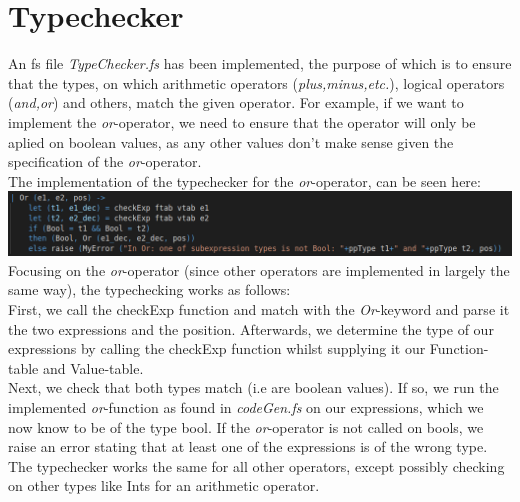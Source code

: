 \section{Typechecker}
An fs file \textit{TypeChecker.fs} has been implemented, the purpose of which is to ensure that the types, on which arithmetic operators (\textit{plus,minus,etc.}), logical operators (\textit{and,or}) and others, match the given operator.
For example, if we want to implement the \textit{or}-operator, we need to ensure that the operator will only be aplied on boolean values, as any other values don't make sense given the specification of the \textit{or}-operator.\\
The implementation of the typechecker for the \textit{or}-operator, can be seen here: \\
\includegraphics[width=\linewidth]{Materials/TypeChecker/Or}\\
Focusing on the \textit{or}-operator (since other operators are implemented in largely the same way), the typechecking works as follows:\\
First, we call the checkExp function and match with the \textit{Or}-keyword and parse it the two expressions and the position.
Afterwards, we determine the type of our expressions by calling the checkExp function whilst supplying it our Function-table and Value-table.\\
Next, we check that both types match (i.e are boolean values). If so, we run the implemented \textit{or}-function as found in \textit{codeGen.fs} on our expressions, which we now know to be of the type bool. If the \textit{or}-operator is not called on bools, we raise an error stating that at least one of the expressions is of the wrong type.\\
The typechecker works the same for all other operators, except possibly checking on other types like Ints for an arithmetic operator. 
